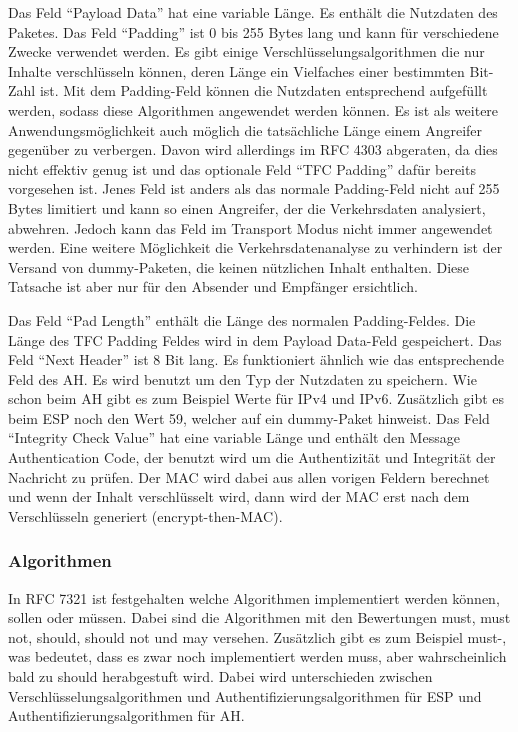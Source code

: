 \documentclass[12pt]{scrartcl}
\begin{document}
Das Feld "`Payload Data"' hat eine variable Länge. Es enthält die Nutzdaten des Paketes. Das Feld "`Padding"' ist 0 bis 255 Bytes lang und kann für verschiedene Zwecke verwendet werden. Es gibt einige Verschlüsselungsalgorithmen die nur Inhalte verschlüsseln können, deren Länge ein Vielfaches einer bestimmten Bit-Zahl ist. Mit dem Padding-Feld können die Nutzdaten entsprechend aufgefüllt werden, sodass diese Algorithmen angewendet werden können. Es ist als weitere Anwendungsmöglichkeit auch möglich die tatsächliche Länge einem Angreifer gegenüber zu verbergen. Davon wird allerdings im RFC 4303 abgeraten, da dies nicht effektiv genug ist und das optionale Feld "`TFC Padding"' dafür bereits vorgesehen ist.\cite{RFC4303} Jenes Feld ist anders als das normale Padding-Feld nicht auf 255 Bytes limitiert und kann so einen Angreifer, der die Verkehrsdaten analysiert, abwehren. Jedoch kann das Feld im Transport Modus nicht immer angewendet werden. Eine weitere Möglichkeit die Verkehrsdatenanalyse zu verhindern ist der Versand von dummy-Paketen, die keinen nützlichen Inhalt enthalten. Diese Tatsache ist aber nur für den Absender und Empfänger ersichtlich.

Das Feld "`Pad Length"' enthält die Länge des normalen Padding-Feldes. Die Länge des TFC Padding Feldes wird in dem Payload Data-Feld gespeichert. Das Feld "`Next Header"' ist 8 Bit lang. Es funktioniert ähnlich wie das entsprechende Feld des AH. Es wird benutzt um den Typ der Nutzdaten zu speichern. Wie schon beim AH gibt es zum Beispiel Werte für IPv4 und IPv6. Zusätzlich gibt es beim ESP noch den Wert 59, welcher auf ein dummy-Paket hinweist. Das Feld "`Integrity Check Value"' hat eine variable Länge und enthält den Message Authentication Code, der benutzt wird um die Authentizität und Integrität der Nachricht zu prüfen. Der MAC wird dabei aus allen vorigen Feldern berechnet und wenn der Inhalt verschlüsselt wird, dann wird der MAC erst nach dem Verschlüsseln generiert (encrypt-then-MAC).

\subsubsection{Algorithmen}
In RFC 7321 ist festgehalten welche Algorithmen implementiert werden können, sollen oder müssen.\cite{RFC7321} Dabei sind die Algorithmen mit den Bewertungen must, must not, should, should not und may versehen. Zusätzlich gibt es zum Beispiel must-, was bedeutet, dass es zwar noch implementiert werden muss, aber wahrscheinlich bald zu should herabgestuft wird. Dabei wird unterschieden zwischen Verschlüsselungsalgorithmen und Authentifizierungsalgorithmen für ESP und Authentifizierungsalgorithmen für AH.
\end{document}
